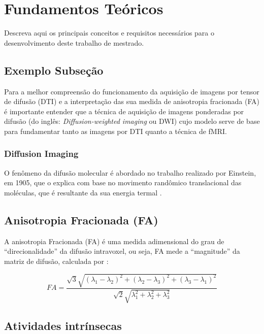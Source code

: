 \documentclass[11pt]{article}
\begin{document}
\section{Fundamentos Teóricos} \label{ch:fundamentos}

Descreva aqui os principais conceitos e requisitos necessários para o desenvolvimento deste trabalho de mestrado.

\subsection{Exemplo Subseção} \label{sec:subsescao}

Para a melhor compreensão do funcionamento da aquisição de imagens por tensor de difusão (DTI) e a interpretação das sua medida de anisotropia fracionada (FA) é importante entender que a técnica de aquisição de imagens ponderadas por difusão (do inglês: \textit{Diffusion-weighted imaging} ou DWI) cujo modelo serve de base para fundamentar tanto as imagens por DTI quanto a técnica de fMRI. 

\subsubsection{Diffusion Imaging}

O fenômeno da difusão molecular é abordado no trabalho realizado por Einstein, em 1905,  que o explica com base no movimento randômico translacional das moléculas, que é resultante da sua energia termal \citep{Einstein}. 

\subsection{Anisotropia Fracionada (FA)}

A anisotropia Fracionada (FA) é uma medida adimensional do grau de “direcionalidade” da difusão intravoxel, ou seja, FA mede a “magnitude” da matriz de difusão, calculada por \citep{Pierpaoli}: 

\begin{equation}
FA=\frac{\sqrt{3}\sqrt{(\lambda_{1}-\lambda_{2})^{2}+(\lambda_{2}-\lambda_{3})^{2}+(\lambda_{3}-\lambda_{1})^{2}}}{\sqrt{2}\sqrt{\lambda_{1}^{2}+\lambda_{2}^{2}+\lambda_{3}^{2}}}
\label{eq:FA}
\end{equation}

\subsection{Atividades intrínsecas}
\end{document}

